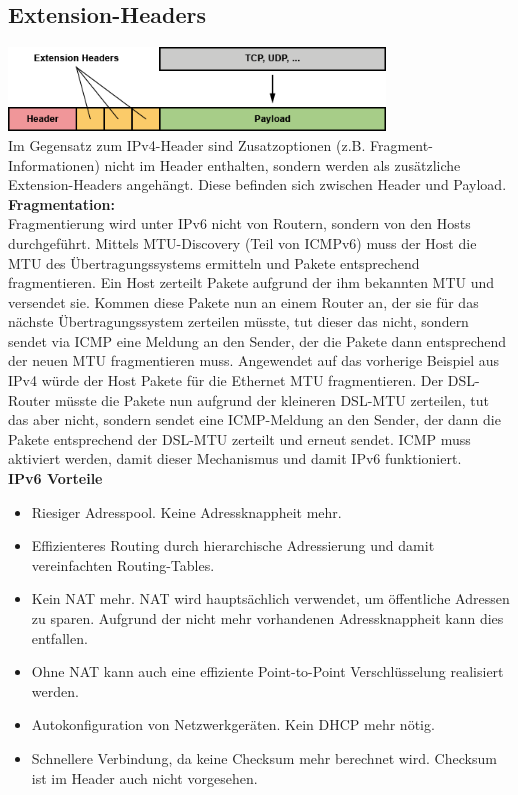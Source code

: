 \documentclass[12pt, a4paper]{article}
\begin{document}
	\subsection*{Extension-Headers}
	\includegraphics[width=10cm]{extension_header.png}\\
	Im Gegensatz zum IPv4-Header sind Zusatzoptionen (z.B. Fragment-Informationen) nicht im Header enthalten, sondern werden als zusätzliche Extension-Headers angehängt. Diese befinden sich zwischen Header und Payload.\\
	\textbf{Fragmentation:}\\
	Fragmentierung wird unter IPv6 nicht von Routern, sondern von den Hosts durchgeführt. Mittels MTU-Discovery (Teil von ICMPv6) muss der Host die MTU des Übertragungssystems ermitteln und Pakete entsprechend fragmentieren. Ein Host zerteilt Pakete aufgrund der ihm bekannten MTU und versendet sie. Kommen diese Pakete nun an einem Router an, der sie für das nächste Übertragungssystem zerteilen müsste, tut dieser das nicht, sondern sendet via ICMP eine Meldung an den Sender, der die Pakete dann entsprechend der neuen MTU fragmentieren muss. Angewendet auf das vorherige Beispiel aus IPv4 würde der Host Pakete für die Ethernet MTU fragmentieren. Der DSL-Router müsste die Pakete nun aufgrund der kleineren DSL-MTU zerteilen, tut das aber nicht, sondern sendet eine ICMP-Meldung an den Sender, der dann die Pakete entsprechend der DSL-MTU zerteilt und erneut sendet.
	ICMP muss aktiviert werden, damit dieser Mechanismus und damit IPv6 funktioniert.\\
	\textbf{IPv6 Vorteile}\\
	\begin{itemize}
		\item Riesiger Adresspool. Keine Adressknappheit mehr.
		\item Effizienteres Routing durch hierarchische Adressierung und damit vereinfachten Routing-Tables.
		\item Kein NAT mehr. NAT wird hauptsächlich verwendet, um öffentliche Adressen zu sparen. Aufgrund der nicht mehr vorhandenen Adressknappheit kann dies entfallen.
		\item Ohne NAT kann auch eine effiziente Point-to-Point Verschlüsselung realisiert werden.
		\item Autokonfiguration von Netzwerkgeräten. Kein DHCP mehr nötig.
		\item Schnellere Verbindung, da keine Checksum mehr berechnet wird. Checksum ist im Header auch nicht vorgesehen.
	\end{itemize}
	
\end{document}
